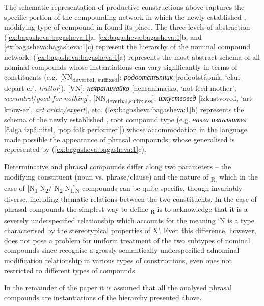 \documentclass[output=paper]{LSP/langsci}
\begin{document}
The schematic representation of productive constructions above captures the specific portion of the compounding network in which the newly established , modifying type of compound in  found its place. The three levels of abstraction (\ref{ex:bagasheva:bagasheva:1}a, \ref{ex:bagasheva:bagasheva:1}b, and \ref{ex:bagasheva:bagasheva:1}c) represent the hierarchy of the nominal compound network: (\ref{ex:bagasheva:bagasheva:1}a) represents the most abstract schema of all nominal compounds whose instantiations can vary significantly in terms of constituents (e.g. [NN\textsubscript{deverbal, suffixed}]: \textit{{родоотстъпник}} [rodootstâpnik, ‘clan-depart-er’, \textit{traitor}]), [VN]: \textit{{нехранимайко}} [nehranimajko, ‘not-feed-mother’, \textit{scoundrel}\slash\textit{good-for-nothing}], [NN\textsubscript{deverbal,suffixless}]: \textit{{изкуствовед}} [izkustvoved, ‘art-know-er’, \textit{art critic\slash expert}], etc. (\ref{ex:bagasheva:bagasheva:1}b) represents the schema of the newly established , root compound type (e.g. \textit{{чалга изпълнител}} [čalga izpâlnitel, ‘pop folk performer’]) whose accommodation in the language made possible the appearance of phrasal compounds, whose generalised  is represented by (\ref{ex:bagasheva:bagasheva:1}c).

Determinative and phrasal compounds differ along two parameters – the modifying constituent (noun vs. phrase\slash clause) and the nature of \textsubscript{R,} which in the case of [N\textsubscript{1} N\textsubscript{2}/ N\textsubscript{2} N\textsubscript{1}]\textsubscript{N} compounds can be quite specific, though invariably diverse, including thematic relations between the two constituents. In the case of phrasal compounds the simplest way to define \textsubscript{R} is to acknowledge that it is a severely underspecified relationship which accounts for the meaning ‘N is a type characterised by the stereotypical properties of X’. Even this difference, however, does not pose a problem for uniform treatment of the two subtypes of nominal compounds since \citet{Bauer2013} recognise a grossly semantically underspecified adnominal modification relationship in various types of constructions, even ones not restricted to different types of compounds. 

In the remainder of the paper it is assumed that all the analysed phrasal compounds are instantiations of the  hierarchy presented above.
\end{document}
